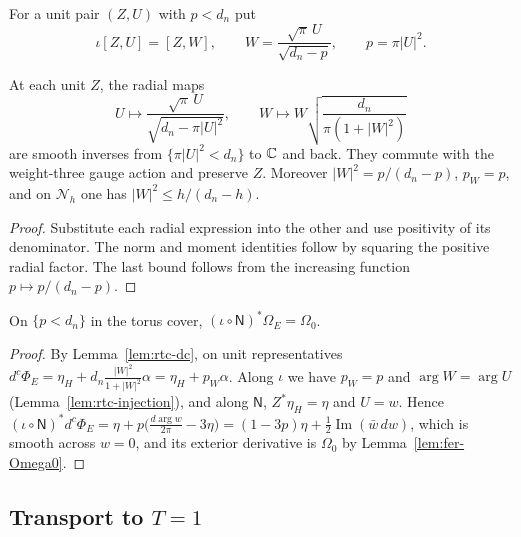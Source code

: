 \begin{construction}\label{cons:rtc-injection}
For a unit pair $(Z,U)$ with $p<d_n$ put
\[
 \iota[Z,U]=[Z,W],\qquad W=\frac{\sqrt\pi\,U}{\sqrt{d_n-p}},\qquad p=\pi|U|^2 .
\]
\end{construction}

\begin{lemma}\label{lem:rtc-injection}
At each unit $Z$, the radial maps
\[
 U\mapsto\frac{\sqrt\pi\,U}{\sqrt{d_n-\pi|U|^2}},\qquad
 W\mapsto W\sqrt{\frac{d_n}{\pi(1+|W|^2)}}
\]
are smooth inverses from $\{\pi|U|^2<d_n\}$ to $\mathbb{C}$ and back.
They commute with the weight-three gauge action and preserve $Z$.
Moreover $|W|^2=p/(d_n-p)$, $p_W=p$, and on $\mathcal N_h$ one has $|W|^2\le h/(d_n-h)$.
\end{lemma}
\begin{proof}
Substitute each radial expression into the other and use positivity of its denominator.
The norm and moment identities follow by squaring the positive radial factor.
The last bound follows from the increasing function $p\mapsto p/(d_n-p)$.
\end{proof}


\begin{proposition}\label{prop:rtc-central}
On $\{p<d_n\}$ in the torus cover,
$(\iota\circ\mathsf N)^*\Omega_E=\Omega_0$.
\end{proposition}
\begin{proof}
By Lemma~\ref{lem:rtc-dc}, on unit representatives
$d^c\Phi_E=\eta_H+d_n\frac{|W|^2}{1+|W|^2}\alpha=\eta_H+p_W\alpha$. Along $\iota$ we have $p_W=p$ and $\arg W=\arg U$
(Lemma~\ref{lem:rtc-injection}), and along $\mathsf N$, $Z^*\eta_H=\eta$ and $U=w$. Hence
$(\iota\circ\mathsf N)^*d^c\Phi_E=\eta+p\bigl(\frac{d\arg w}{2\pi}-3\eta\bigr)=(1-3p)\eta+\frac12\operatorname{Im}(\bar w\,dw)$, which is
smooth across $w=0$, and its exterior derivative is $\Omega_0$ by Lemma~\ref{lem:fer-Omega0}.
\end{proof}


\subsection{Transport to $T=1$}\label{sec:rtc-transport}

